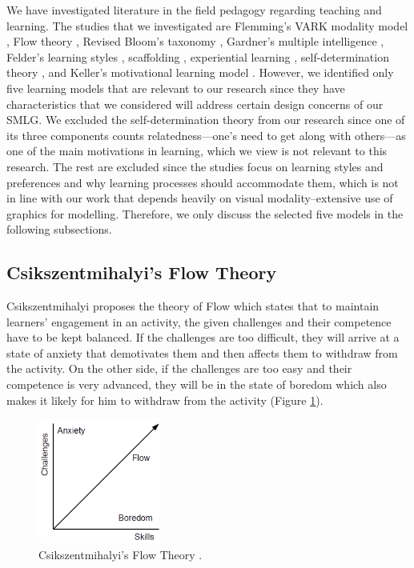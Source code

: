 \documentclass[12pt, a4paper]{report}
\begin{document}
We have investigated literature in the field pedagogy regarding teaching and learning. The studies that we investigated are Flemming's VARK modality model \cite{fleming2006learning}, Flow theory \cite{csikszentmihalyi2014toward}, Revised Bloom's taxonomy \cite{krathwohl2002revision}, Gardner's multiple intelligence \cite{gardner2011frames}, Felder's learning styles \cite{felder1988learning},  scaffolding \cite{wood1976role, vygotsky1978mind}, experiential learning \cite{kolb2014experiential}, self-determination theory \cite{ryan2000self}, and Keller's motivational learning model \cite{keller2010motivational}. However, we identified only five learning models that are relevant to our research since they have characteristics that we considered will address certain design concerns of our SMLG. We excluded the self-determination theory from our research since one of its three components counts relatedness---one's need to get along with others---as one of the main motivations in learning, which we view is not relevant to this research. The rest are excluded since the studies focus on learning styles and preferences and why learning processes should accommodate them, which is not in line with our work that depends heavily on visual modality--extensive use of graphics for modelling. Therefore, we only discuss the selected five models in the following subsections.

\subsection{Csikszentmihalyi's Flow Theory}
Csikszentmihalyi \cite{csikszentmihalyi2014toward} proposes the theory of Flow which states that to maintain learners' engagement in an activity, the given challenges and their competence have to be kept balanced. If the challenges are too difficult, they will arrive at a state of anxiety that demotivates them and then affects them to withdraw from the activity. On the other side, if the challenges are too easy and their competence is very advanced, they will be in the state of boredom which also makes it likely for him to withdraw from the activity (Figure \ref{flow-theory}).

\begin{figure}[ht]
\centering
\includegraphics[width=4cm]{flow-theory}
\caption{Csikszentmihalyi's Flow Theory \cite{csikszentmihalyi2014toward}.}
\label{flow-theory}
\end{figure}
 
\end{document}

